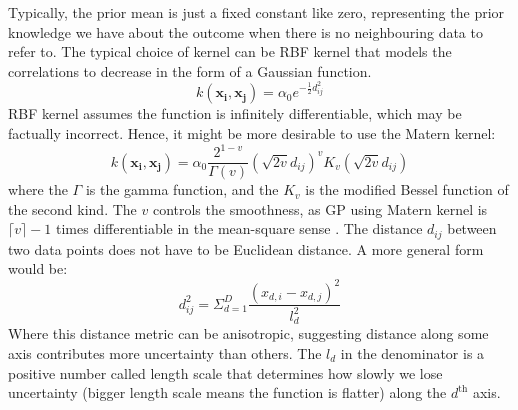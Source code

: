 Typically, the prior mean is just a fixed constant like zero, representing the prior knowledge we have about the outcome when there is no neighbouring data to refer to.
The typical choice of kernel can be RBF kernel that models the correlations to decrease in the form of a Gaussian function.
\begin{equation}
k(\bm{x_i}, \bm{x_j}) = \alpha_0 e^{-\frac{1}{2} d_{ij}^2}
\label{RBF_kernel}
\end{equation}
RBF kernel assumes the function is infinitely differentiable, which may be factually incorrect. Hence, it might be more desirable to use the Matern kernel:
\begin{equation}
k(\bm{x_i}, \bm{x_j}) = \alpha_0 \frac{2^{1-v}}{\Gamma(v)}
(\sqrt{2v} d_{ij})^v K_v(\sqrt{2v} d_{ij})
\label{Matern}
\end{equation}
where the $\Gamma$ is the gamma function, and the $K_v$ is the modified Bessel function of the second kind. The $v$ controls the smoothness, as GP using Matern kernel is $\lceil v \rceil - 1$ times differentiable in the mean-square sense \cite{GP, Matern}.
The distance $d_{ij}$ between two data points does not have to be Euclidean distance. A more general form would be:
\begin{equation}
d_{ij}^2 = \Sigma_{d=1}^D \frac{(x_{d, i} - x_{d, j})^2}{l_d^2}
\label{distance_metric}
\end{equation}
Where this distance metric can be anisotropic, suggesting distance along some axis contributes more uncertainty than others. 
The $l_d$ in the denominator is a positive number called length scale that determines how slowly we lose uncertainty (bigger length scale means the function is flatter) along the $d^\text{th}$ axis.


